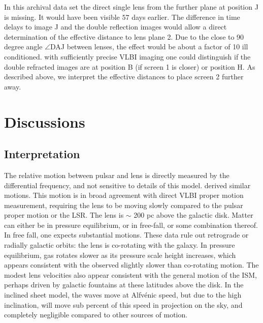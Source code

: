 \documentclass[useAMS,usenatbib]{mn2e}
\begin{document}

In this archival data set the direct single lens from the further
plane at position J is missing.  It would have been visible $57$ days
earlier. The difference in time delays to image J and the double
reflection images would allow a direct determination of the effective
distance to lens plane 2.  Due to the close to 90 degree angle $\angle$DAJ
between lenses, the effect would be about a factor of 10 ill
conditioned.  with sufficiently precise VLBI imaging one could
distinguish if the double refracted images are at position B (if
screen 1 is closer) or position H.  As described above, we interpret
the effective distances to place screen 2 further away.

\section{Discussions}

\subsection{Interpretation}

The relative motion between pulsar and lens is directly measured by
the differential frequency, and not sensitive to details of this
model.  \citep{2010ApJ...708..232B} derived similar motions.  This
motion is in broad agreement with direct VLBI proper motion
measurement, requiring the lens to be moving slowly compared to the
pulsar proper motion or the LSR.  The lens is $\sim$ 200 pc above the
galactic disk.  Matter can either be in pressure equilibrium, or in
free-fall, or some combination thereof.  In free fall, one expects
substantial motions.  These data rule out retrograde or radially
galactic orbits: the lens is co-rotating with the galaxy.  In pressure
equilibrium, gas rotates slower as its pressure scale height
increases, which appears consistent with the observed slightly slower
than co-rotating motion.  The modest lens velocities also appear
consistent with the general motion of the ISM, perhaps driven by
galactic fountains\citep{1976ApJ...205..762S} at these latitudes above
the disk.  In the inclined sheet model, the waves move at Alfv\'enic
speed, but due to the high inclination, will move sub percent of this
speed in projection on the sky, and completely negligible compared to
other sources of motion.
\end{document}
